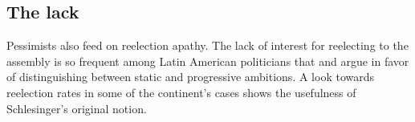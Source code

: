 \documentclass[letter,12pt]{article}
\newcommand{\mc}{\multicolumn}
\begin{document}
\subsection{The lack}

Pessimists also feed on reelection apathy. The lack of interest for reelecting to the assembly is so frequent among Latin American politicians that \citet{morgenstern.2002b} and \citet{micozziPhD2009} argue in favor of distinguishing between static and progressive ambitions. A look towards reelection rates in some of the continent's cases shows the usefulness of Schlesinger's \citeyearpar{schlesinger.1966} original notion.

\end{document}

